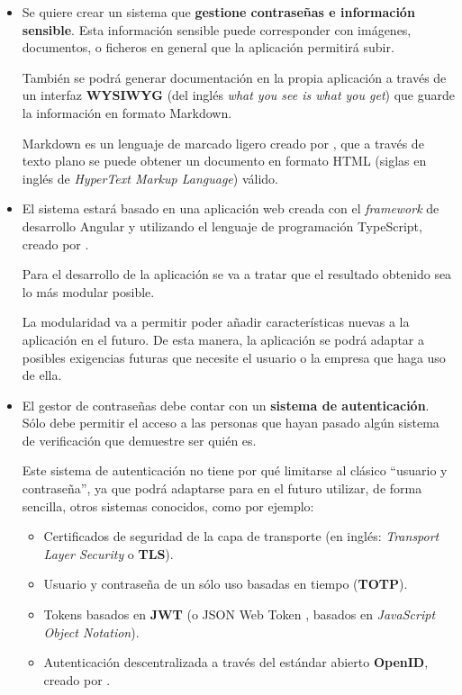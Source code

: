 \documentclass{\ClassPath/viu-tfm-template}
\begin{document}
\begin{itemize}

    \item Se quiere crear un sistema que \textbf{gestione contraseñas e información sensible}. Esta información sensible puede corresponder con imágenes, documentos, o ficheros en general que la aplicación permitirá subir.

    También se podrá generar documentación en la propia aplicación a través de un interfaz \textbf{WYSIWYG} (del inglés \textit{what you see is what you get}) que guarde la información en formato Markdown.

    Markdown es un lenguaje de marcado ligero creado por \textcite{markdown}, que a través de texto plano se puede obtener un documento en formato HTML (siglas en inglés de \textit{HyperText Markup Language}) válido.

    \item El sistema estará basado en una aplicación web creada con el \textit{framework} de desarrollo Angular y utilizando el lenguaje de programación TypeScript, creado por \textcite{typescript}.

    Para el desarrollo de la aplicación se va a tratar que el resultado obtenido sea lo más modular posible.

    La modularidad va a permitir poder añadir características nuevas a la aplicación en el futuro. De esta manera, la aplicación se podrá adaptar a posibles exigencias futuras que necesite el usuario o la empresa que haga uso de ella.

    \item El gestor de contraseñas debe contar con un \textbf{sistema de autenticación}. Sólo debe permitir el acceso a las personas que hayan pasado algún sistema de verificación que demuestre ser quién es.

    Este sistema de autenticación no tiene por qué limitarse al clásico “usuario y contraseña”, ya que podrá adaptarse para en el futuro utilizar, de forma sencilla, otros sistemas conocidos, como por ejemplo:
    \begin{itemize}
        \item Certificados de seguridad de la capa de transporte (en inglés: \textit{Transport Layer Security} o \textbf{TLS}).
        \item Usuario y contraseña de un sólo uso basadas en tiempo (\textbf{TOTP}).
        \item Tokens basados en \textbf{JWT} (o JSON Web Token , basados en \textit{JavaScript Object Notation}).
        \item Autenticación descentralizada a través del estándar abierto \textbf{OpenID}, creado por \textcite{openid}.
    \end{itemize}


\end{itemize}
\end{document}
